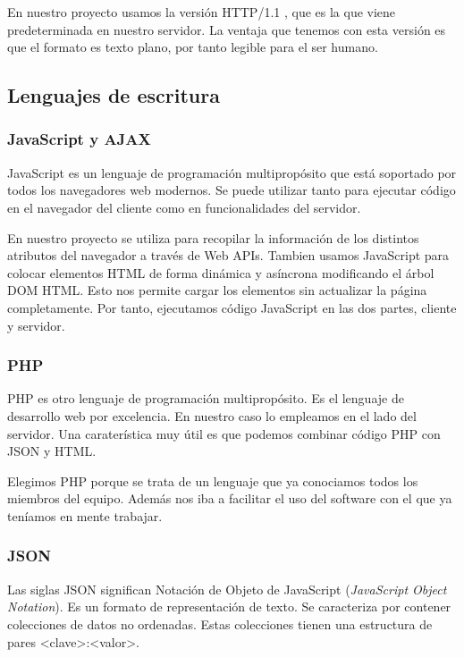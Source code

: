 En nuestro proyecto usamos la versión HTTP/1.1 , que es la que viene predeterminada en nuestro servidor. La ventaja que tenemos con esta versión es que el formato es texto plano, por tanto legible para el ser humano. \par

\subsection{Lenguajes de escritura}

\subsubsection{JavaScript y AJAX}
JavaScript es un lenguaje de programación multipropósito que está soportado por todos los navegadores web modernos. Se puede utilizar tanto para ejecutar código en el navegador del cliente como en funcionalidades del servidor. \par

En nuestro proyecto se utiliza para recopilar la información de los distintos atributos del navegador a través de Web APIs. Tambien usamos JavaScript para  colocar elementos HTML de forma dinámica y asíncrona modificando el árbol DOM HTML. Esto nos permite cargar los elementos sin actualizar la página completamente. Por tanto, ejecutamos código JavaScript en las dos partes, cliente y servidor. \par

\subsubsection{PHP}

PHP es otro lenguaje de programación multipropósito. Es el lenguaje de desarrollo web por excelencia. En nuestro caso lo empleamos en el lado del servidor. Una caraterística muy útil es que podemos combinar código PHP con JSON y HTML. \par 
Elegimos PHP porque se trata de un lenguaje que ya conociamos todos los miembros del equipo. Además nos iba a facilitar el uso del software con el que ya teníamos en mente trabajar. \par 

\subsubsection{JSON}
Las siglas JSON significan Notación de Objeto de JavaScript (\textit{JavaScript Object Notation}). Es un formato de representación de texto. Se caracteriza por contener colecciones de datos no ordenadas. Estas colecciones tienen una estructura de pares <clave>:<valor>.\par


